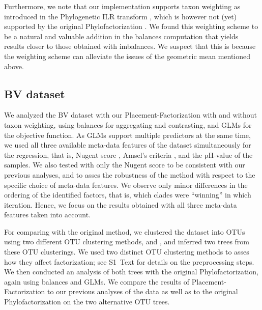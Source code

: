 Furthermore, we note that our implementation supports taxon weighting
as introduced in the Phylogenetic ILR transform \cite{Silverman2017},
which is however not (yet) supported by the original Phylofactorization \cite{Washburne2017a}.
We found this weighting scheme to be a natural and valuable addition in the balances computation
that yields results closer to those obtained with imbalances.
We suspect that this is because the weighting scheme can alleviate the issues of the geometric mean mentioned above.



\subsection{BV dataset}
\label{ch:Factorization:sec:Evaluation:sub:BVDataset}

We analyzed the \ac{BV} dataset \cite{Srinivasan2012} with our Placement-Factorization with and without taxon weighting,
using balances for aggregating and contrasting, and \acp{GLM} for the objective function.
As \acp{GLM} support multiple predictors at the same time,
we used all three available meta-data features of the dataset simultaneously for the regression,
that is, Nugent score \cite{Nugent1991}, Amsel's criteria \cite{Amsel1983}, and the pH-value of the samples.
We also tested with only the Nugent score to be consistent with our previous analyses,
and to asses the robustness of the method with respect to the specific choice of meta-data features.
We observe only minor differences in the ordering of the identified factors,
that is, which clades were ``winning'' in which iteration.
Hence, we focus on the results obtained with all three meta-data features taken into account.

For comparing with the original method, we clustered the dataset into OTUs using two different OTU clustering methods,
 \cite{Rognes2016} and  \cite{Mahe2014,Mahe2015},
and inferred two trees from these OTU clusterings.
We used two distinct OTU clustering methods to asses how they affect factorization;
see S1~Text for details on the preprocessing steps.
We then conducted an analysis of both trees with the original Phylofactorization,
again using balances and \acp{GLM}.
We compare the results of Placement-Factorization to our previous analyses of the data
as well as to the original Phylofactorization on the two alternative OTU trees.


